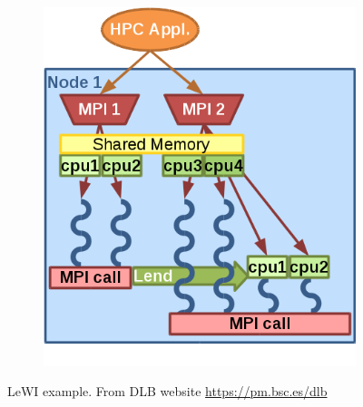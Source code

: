 \begin{figure}[h]
\begin{subfigure}{0.4\textwidth}
  \end{subfigure}
  \hfill
  \centering
  \begin{subfigure}{0.5\textwidth}
    \includegraphics[width=0.8\linewidth]{graphics/dlb_example_lewi.png}
    \label{lewiex}
  \end{subfigure}
  \caption[LeWI example.]{LeWI example. From DLB website \url{https://pm.bsc.es/dlb}}
  \label{lewiexample}
\end{figure}

